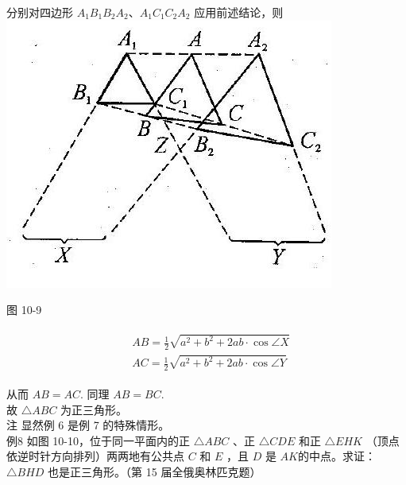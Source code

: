 \documentclass[10pt]{article}
\begin{document}
分别对四边形 $A_{1} B_{1} B_{2} A_{2} 、 A_{1} C_{1} C_{2} A_{2}$ 应用前述结论，则\\
\includegraphics[max width=\textwidth, center]{2024_10_30_2c8f45efd4a519b08e1ag-099}

图 10-9

\begin{align*}
\begin{aligned}
& A B=\frac{1}{2} \sqrt{a^{2}+b^{2}+2 a b \cdot \cos \angle X} \\
& A C=\frac{1}{2} \sqrt{a^{2}+b^{2}+2 a b \cdot \cos \angle Y}
\end{aligned}
\end{align*}

从而 $A B=A C$. 同理 $A B=B C$.\\
故 $\triangle A B C$ 为正三角形。\\
注 显然例 6 是例 7 的特殊情形。\\
例8 如图 10-10，位于同一平面内的正 $\triangle A B C$ 、正 $\triangle C D E$ 和正 $\triangle E H K$ （顶点依逆时针方向排列）两两地有公共点 $C$ 和 $E$ ，且 $D$ 是 $A K$的中点。求证： $\triangle B H D$ 也是正三角形。（第 15 届全俄奥林匹克题）
\end{document}
